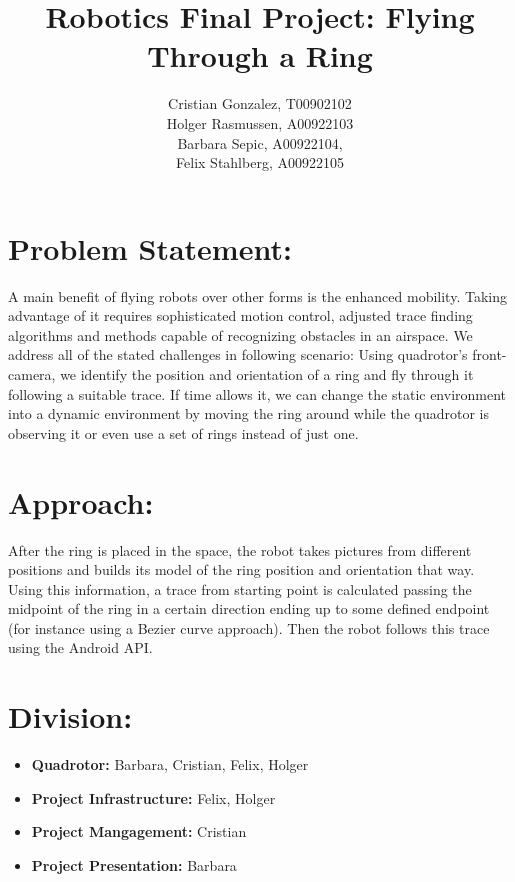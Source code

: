 \documentclass[letter,12pt]{article}
\begin{document}
\title{Robotics Final Project: Flying Through a Ring}
\author{Cristian Gonzalez, T00902102\\
Holger Rasmussen, A00922103\\
Barbara Sepic, A00922104,\\
Felix Stahlberg, A00922105
}
\maketitle

\section*{Problem Statement:}
A main benefit of flying robots over other forms is the enhanced mobility. Taking advantage of it requires sophisticated motion control, adjusted trace finding algorithms and methods capable of recognizing obstacles in an airspace. We address all of the stated challenges in following scenario: Using quadrotor’s front-camera, we identify the position and orientation of a ring and fly through it following a suitable trace.  If time allows it, we can change the static environment into a dynamic environment by moving the ring around while the quadrotor is observing it or even use a set of rings instead of just one.


\section*{Approach:}
After the ring is placed in the space, the robot takes pictures from different positions and builds its model of the ring position and orientation that way. Using this information, a trace from starting point is calculated passing the midpoint of the ring in a certain direction ending up to some defined endpoint (for instance using a Bezier curve approach). Then the robot follows this trace using the Android API.

\section*{Division:}
\begin{itemize}
	\item \textbf{Quadrotor:} Barbara, Cristian, Felix, Holger
	\item \textbf{Project Infrastructure:} Felix, Holger
	\item \textbf{Project Mangagement:}	Cristian
	\item \textbf{Project Presentation:} Barbara
\end{itemize}
\end{document}
